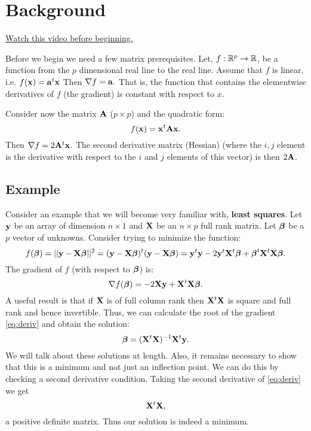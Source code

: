 \chapter{Background}
\label{chap:background}

\href{https://www.youtube.com/watch?v=TrZdG642M4g&index=1&list=PLpl-gQkQivXhdgUCdaUQcdb31CRe8Mm2y}{Watch this video before beginning.}

Before we begin we need a few matrix prerequisites. Let,
$f: \mathbb{R}^p \rightarrow \mathbb{R}$,
be a function from the $p$ dimensional real line to the real line.
Assume that $f$ is linear, i.e. $f(\mathbf{x}) = \mathbf{a}^t \mathbf{x}$
Then $ \nabla f = \mathbf{a}.$ That is, the function that
contains the elementwise derivatives of $f$ (the gradient)
is constant with respect to $x$. 

Consider now the matrix $\mathbf{A}$
($p\times p$) and the quadratic form:
$$
f(\mathbf{x}) =  \mathbf{x}^t \mathbf{A} \mathbf{x}.
$$
Then  $ \nabla f = 2 \mathbf{A}^t \mathbf{x}.$ The second derivative matrix (Hessian)
(where the $i, j$ element is the derivative
with respect to the $i$ and $j$ elements of this vector)
is then $2 \mathbf{A} $.

\section{Example}

Consider an example that we will become very familiar with, {\bf least squares}.
Let $\mathbf{y}$ be an array of dimension $n\times 1$ and 
$\mathbf{X}$ be an $n\times p$ full rank matrix. Let $\boldsymbol{\beta}$ be a
$p$ vector of unknowns. Consider trying to minimize the function:
$$
f(\boldsymbol{\beta}) = ||\mathbf{y} -  \mathbf{X} \boldsymbol{\beta}||^2 = (\mathbf{y} - \mathbf{X} \boldsymbol{\beta} )^t (\mathbf{y} -  \mathbf{X} \boldsymbol{\beta})
= \mathbf{y}^t \mathbf{y} - 2 \mathbf{y}^t \mathbf{X}^t \boldsymbol{\beta} + \boldsymbol{\beta}^t \mathbf{X}^t \mathbf{X} \boldsymbol{\beta}.
$$
The gradient of $f$ (with respect to $\boldsymbol{\beta}$) is:
\begin{equation}
\label{eq:deriv}
\nabla f(\boldsymbol{\beta}) = -2 \mathbf{X} \mathbf{y} + \mathbf{X}^t\mathbf{X} \boldsymbol{\beta}.
\end{equation}
A useful result is that if $\mathbf{X}$ is of full column rank then
$\mathbf{X}^t \mathbf{X}$ is square and full rank and hence invertible. Thus, we can
calculate the root of the gradient \eqref{eq:deriv} and obtain the solution:
$$
\boldsymbol{\beta} = (\mathbf{X}^t \mathbf{X})^{-1} \mathbf{X}^t \mathbf{y}. 
$$
We will talk about these solutions at length. Also, it remains
necessary to show that this is a minimum and not just an
inflection point. We can do this by checking a second derivative
condition. Taking the second derivative of \eqref{eq:deriv} we 
get
$$
\mathbf{X}^t\mathbf{X},
$$
a positive definite matrix. Thus our solution is indeed a minimum.

